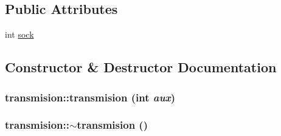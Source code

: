 \subsection*{Public Attributes}
\begin{DoxyCompactItemize}
\item 
int \hyperlink{classtransmision_a3852938bfe54a2b913a7965824fb2acf}{sock}
\end{DoxyCompactItemize}


\subsection{Constructor \& Destructor Documentation}
\hypertarget{classtransmision_a9cbd838625edd4d839b03bc1236a2ca2}{
\subsubsection[{transmision}]{\setlength{\rightskip}{0pt plus 5cm}transmision::transmision (int {\em aux})}}
\label{classtransmision_a9cbd838625edd4d839b03bc1236a2ca2}
\hypertarget{classtransmision_ae7d8d3fccee4ddb493e97061c5811cad}{
\subsubsection[{$\sim$transmision}]{\setlength{\rightskip}{0pt plus 5cm}transmision::$\sim$transmision ()}}
\label{classtransmision_ae7d8d3fccee4ddb493e97061c5811cad}


